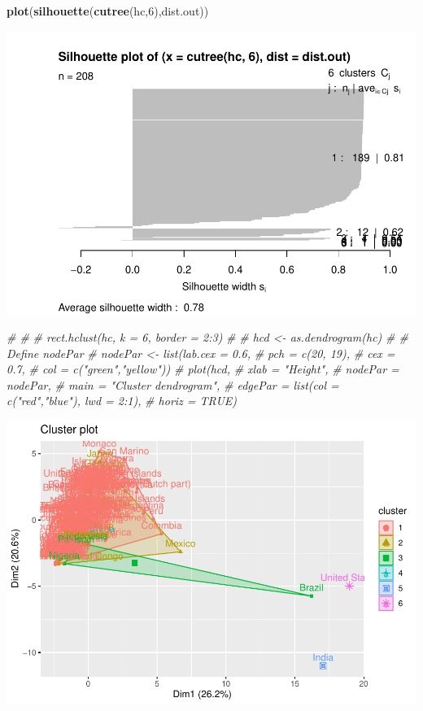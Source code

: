 \documentclass[
]{article}
\newenvironment{Shaded}{\begin{snugshade}}{\end{snugshade}}
\newcommand{\CommentTok}[1]{\textcolor[rgb]{0.56,0.35,0.01}{\textit{#1}}}
\newcommand{\DecValTok}[1]{\textcolor[rgb]{0.00,0.00,0.81}{#1}}
\newcommand{\KeywordTok}[1]{\textcolor[rgb]{0.13,0.29,0.53}{\textbf{#1}}}
\newcommand{\NormalTok}[1]{#1}
\begin{document}
\begin{Shaded}
\begin{Highlighting}[]
\KeywordTok{plot}\NormalTok{(}\KeywordTok{silhouette}\NormalTok{(}\KeywordTok{cutree}\NormalTok{(hc,}\DecValTok{6}\NormalTok{),dist.out))}
\end{Highlighting}
\end{Shaded}

\includegraphics{Assignment1_files/figure-latex/unnamed-chunk-26-12.pdf}

\begin{Shaded}
\begin{Highlighting}[]
\CommentTok{# # }
\CommentTok{# rect.hclust(hc, k = 6, border = 2:3)}
\CommentTok{# }
\CommentTok{# hcd <- as.dendrogram(hc)}
\CommentTok{# # Define nodePar}
\CommentTok{# nodePar <- list(lab.cex = 0.6,}
\CommentTok{#                 pch = c(20, 19),}
\CommentTok{#                 cex = 0.7,}
\CommentTok{#                 col = c("green","yellow"))}
\CommentTok{# plot(hcd,}
\CommentTok{#      xlab = "Height",}
\CommentTok{#      nodePar = nodePar,}
\CommentTok{#      main = "Cluster dendrogram",}
\CommentTok{#      edgePar = list(col = c("red","blue"), lwd = 2:1),}
\CommentTok{#      horiz = TRUE)}
\end{Highlighting}
\end{Shaded}

\includegraphics{Assignment1_files/figure-latex/unnamed-chunk-27-1.pdf}
\end{document}
